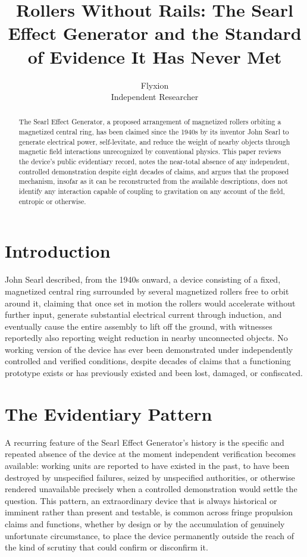 \documentclass[11pt]{article}
\title{Rollers Without Rails: The Searl Effect Generator and the Standard of Evidence It Has Never Met}
\author{Flyxion \\ \small Independent Researcher}
\date{}
\begin{document}
\maketitle

\begin{abstract}
The Searl Effect Generator, a proposed arrangement of magnetized rollers orbiting a magnetized central ring, has been claimed since the 1940s by its inventor John Searl to generate electrical power, self-levitate, and reduce the weight of nearby objects through magnetic field interactions unrecognized by conventional physics. This paper reviews the device's public evidentiary record, notes the near-total absence of any independent, controlled demonstration despite eight decades of claims, and argues that the proposed mechanism, insofar as it can be reconstructed from the available descriptions, does not identify any interaction capable of coupling to gravitation on any account of the field, entropic or otherwise.
\end{abstract}

\section{Introduction}

John Searl described, from the 1940s onward, a device consisting of a fixed, magnetized central ring surrounded by several magnetized rollers free to orbit around it, claiming that once set in motion the rollers would accelerate without further input, generate substantial electrical current through induction, and eventually cause the entire assembly to lift off the ground, with witnesses reportedly also reporting weight reduction in nearby unconnected objects. No working version of the device has ever been demonstrated under independently controlled and verified conditions, despite decades of claims that a functioning prototype exists or has previously existed and been lost, damaged, or confiscated.

\section{The Evidentiary Pattern}

A recurring feature of the Searl Effect Generator's history is the specific and repeated absence of the device at the moment independent verification becomes available: working units are reported to have existed in the past, to have been destroyed by unspecified failures, seized by unspecified authorities, or otherwise rendered unavailable precisely when a controlled demonstration would settle the question. This pattern, an extraordinary device that is always historical or imminent rather than present and testable, is common across fringe propulsion claims and functions, whether by design or by the accumulation of genuinely unfortunate circumstance, to place the device permanently outside the reach of the kind of scrutiny that could confirm or disconfirm it.
\end{document}
